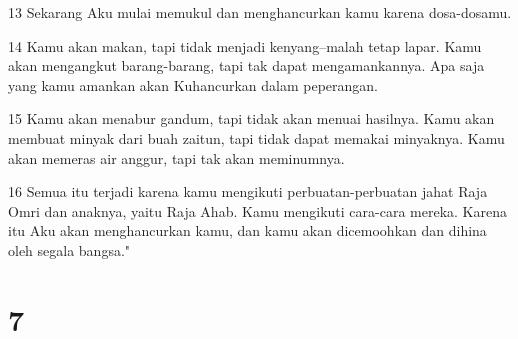 \par 13 Sekarang Aku mulai memukul dan menghancurkan kamu karena dosa-dosamu.
\par 14 Kamu akan makan, tapi tidak menjadi kenyang--malah tetap lapar. Kamu akan mengangkut barang-barang, tapi tak dapat mengamankannya. Apa saja yang kamu amankan akan Kuhancurkan dalam peperangan.
\par 15 Kamu akan menabur gandum, tapi tidak akan menuai hasilnya. Kamu akan membuat minyak dari buah zaitun, tapi tidak dapat memakai minyaknya. Kamu akan memeras air anggur, tapi tak akan meminumnya.
\par 16 Semua itu terjadi karena kamu mengikuti perbuatan-perbuatan jahat Raja Omri dan anaknya, yaitu Raja Ahab. Kamu mengikuti cara-cara mereka. Karena itu Aku akan menghancurkan kamu, dan kamu akan dicemoohkan dan dihina oleh segala bangsa."

\chapter{7}

